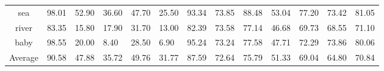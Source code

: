 \begin{sidewaystable}
\begin{tabular}{|c|p{1.7cm}| p{1.7cm}| p{1.7cm}| p{1.7cm}|p{1.2cm}| p{1.2cm}|p{1cm}| p{1cm}|p{1cm}| p{1cm}|p{1.4cm}| p{1.2cm}||}
sea & 98.01 & 52.90 & 36.60 & 47.70 & 25.50 & 93.34 & 73.85 & 88.48 & 53.04 & 77.20 & 73.42 & 81.05 \\  [1ex]
river & 83.35 & 15.80 & 17.90 & 31.70 & 13.00 & 82.39 & 73.58 & 77.14 & 46.68 & 69.73 & 68.55 & 71.10 \\  [1ex]
baby & 98.55 & 20.00 & 8.40 & 28.50 & 6.90 & 95.24 & 73.24 & 77.58 & 47.71 & 72.29 & 73.86 & 80.06 \\  [1ex] \hline
Average & 90.58 & 47.88 & 35.72 & 49.76 & 31.77 & 87.59 & 72.64 & 75.79 & 51.33 & 69.04 & 64.80 & 70.84 \\  [1ex] \hline
\end{tabular}
\label{table:MIRPrecision} %
\end{sidewaystable}

\newpage
